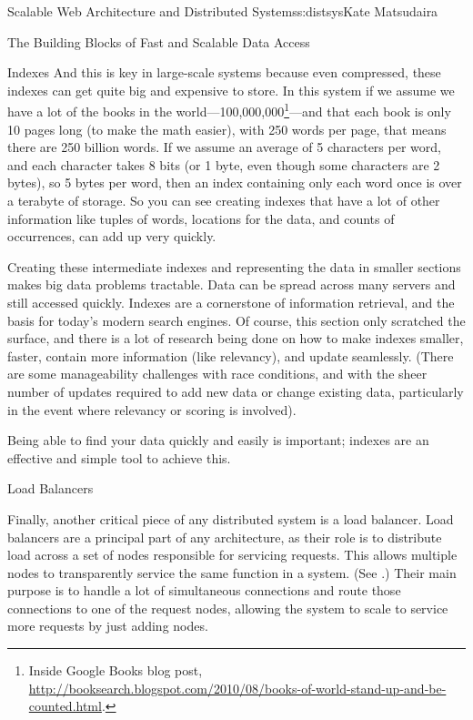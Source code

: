 \begin{aosachapter}{Scalable Web Architecture and Distributed Systems}{s:distsys}{Kate Matsudaira}
\begin{aosasect1}{The Building Blocks of Fast and Scalable Data Access}
\begin{aosasect2}{Indexes}
And this is key in large-scale systems because even compressed, these
indexes can get quite big and expensive to store. In this system if we
assume we have a lot of the books in the 
world---100,000,000\footnote{Inside Google Books blog post,
  \url{http://booksearch.blogspot.com/2010/08/books-of-world-stand-up-and-be-counted.html}.}---and that each book is only 10 pages long (to make the 
math easier),
with 250 words per page, that means there are 250 billion words. If
we assume an average of 5 characters per word, and each character takes 8 bits (or
1 byte, even though some characters are 2 bytes), so 5 bytes per word,
then an index containing only each word once is over a terabyte of storage.
So you can see creating indexes that have a lot
of other information like tuples of words, locations for the data,
and counts of occurrences, can add up very quickly.

Creating these intermediate indexes and representing the data in
smaller sections makes big data problems tractable. Data can
be spread across many servers and still accessed quickly. Indexes are
a cornerstone of information retrieval, and the basis for today's
modern search engines. Of course, this section only scratched the
surface, and there is a lot of research being done on how to make
indexes smaller, faster, contain more
information (like relevancy), and update seamlessly. (There are some
manageability challenges with race conditions, and with the sheer number of
updates required to add new data or change existing
data, particularly in the event where relevancy or scoring is
involved).

Being able to find your data quickly and easily is important; indexes
are an effective and simple tool to achieve this.

\end{aosasect2}

\begin{aosasect2}{Load Balancers}

Finally, another critical piece of any distributed system is a load
balancer. Load balancers are a principal part of any architecture, as their
role is to distribute load across a set of nodes responsible for
servicing requests. This allows multiple nodes to transparently
service the same function in a system. (See .) Their main purpose is to handle
a lot of simultaneous connections and route those connections to one
of the request nodes, allowing the system to scale to service more
requests by just adding nodes.


\end{aosasect2}
\end{aosasect1}
\end{aosachapter}
